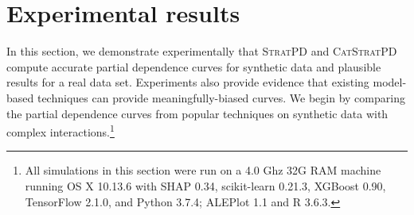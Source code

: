 \documentclass[smallextended]{svjour3}       %
\newcommand{\cut}[1]{}
\newcommand{\spd}{\fontfamily{cmr}\textsc{\small StratPD}}
\newcommand{\cspd}{\fontfamily{cmr}\textsc{\small CatStratPD}}
\renewcommand{\slash}{\texttt{\char`\\}}
\DeclareMathOperator{\Ex}{\mathbb{E}}
\begin{document}
\cut{
{\bf Comparison}

${\it FPD}_j(z) = \Ex[\hat{f}(x_{j}=z,{\bf X}_{\slash j})])$

SHAP for one $S$ is $\phi_j(\hat{f},{\bf x}) = \Ex[\hat{f}(x_{S \cup \{j\}},{\bf X}_{\slash (S \cup \{j\})})  | {\bf X}_{S \cup \{j\}} = x_{S \cup \{j\}}] - \Ex[\hat{f}(x_{S},{\bf X}_{\slash S})  | {\bf X}_S = x_S ]$ for all subsets $S \subset F$ for $F = \{1, 2, .., p\}$. When $S = F \slash \{j\}$, like ALE, it becomes $\Ex[\hat{f}(x_F)] - \Ex[\hat{f}(x_{F \slash \{j\}},{\bf X}_j)]$ or $\hat{f}({\bf x}) - \text{\it FPD}_{F \slash \{j\}}(x)$ if assume independence.

ALE at $x_j=z$, it is cumsum of $\Ex[\hat{f}(b_k, {\bf X}_{\slash j}) - \hat{f}(b_{k-1}, {\bf X}_{\slash j}) \, | \, x_j \in (b_{k-1},b_k]]$ for bin $b_k$ partitioning min..max for var $j$ into $K$ intervals.

StratPD at $x_j=z$ is $\Ex[ (y^{(i_L+1)} - y^{i_L})/(x_j^{(i_L+1)} - x_j^{(i_L)}) \, | \, z \in [x_j^{(i_L+1)} - x_j^{(i_L)}) \text{ and } L \in T]$

$\Ex[ \phi_j(\hat{f},x) | {\bf X}_j = z] = FPD_j(x) - \bar{y}$ if features independent. SHAP's implementation approximates $\hat{f}$ trained on just $S$ features, $\hat{f}_S(x_S)$, with $\Ex[\hat{f}(x_{S},{\bf X}_{\bar{S}})]$ by assuming independent features.
}

\section{Experimental results}\label{sec:experiments} 

In this section, we demonstrate experimentally that \spd{} and \cspd{} compute accurate partial dependence curves for synthetic data and plausible results for a real data set. Experiments also provide evidence that existing model-based techniques can provide meaningfully-biased curves. We begin by comparing the partial dependence curves from popular techniques on synthetic data with complex interactions.\footnote{All simulations in this section were run on a 4.0 Ghz 32G RAM machine running OS X 10.13.6 with SHAP 0.34, scikit-learn 0.21.3, XGBoost 0.90, TensorFlow 2.1.0, and Python 3.7.4; ALEPlot 1.1 and R 3.6.3.}
\end{document}
